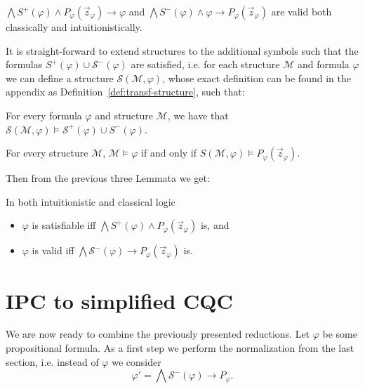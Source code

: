 \documentclass[runningheads]{llncs}
\begin{document}
\begin{lemma}
	$\bigwedge S^+(\varphi)\wedge P_\varphi(\vec z_\varphi)\to\varphi$ and $\bigwedge S^-(\varphi)\wedge \varphi\to P_\varphi(\vec z_\varphi)$ are valid both classically and intuitionistically.
\end{lemma}

It is straight-forward to extend structures to the additional symbols such that the formulas $S^+(\varphi)\cup\mathcal S^-(\varphi)$ are satisfied, i.e. for each structure $\mathcal M$ and formula $\varphi$ we can define a structure $\mathcal S(\mathcal M, \varphi)$, whose exact definition can be found in the appendix as Definition~\ref{def:transf-structure}, such that:
\begin{lemma}\label{thm:struct1}
For every formula $\varphi$ and structure $\mathcal M$, we have that $\mathcal S(\mathcal M, \varphi)\models\mathcal S^+(\varphi)\cup S^-(\varphi)$.
\end{lemma}

\begin{lemma}\label{thm:struct2}
	For every structure $\mathcal M$,
	$\mathcal M\models \varphi$ if and only if $S(\mathcal M, \varphi)\models P_\varphi(\vec z_\varphi)$.
\end{lemma}

Then from the previous three Lemmata we get:

\begin{corollary}\label{equivalid}
	In both intuitionistic and classical logic
	\begin{itemize}
		\item $\varphi$ is satisfiable iff $\mathcal \bigwedge S^+(\varphi)\wedge P_\varphi(\vec z_\varphi)$ is, and
		\item $\varphi$ is valid iff $\bigwedge\mathcal S^-(\varphi)\to P_\varphi(\vec z_\varphi)$ is.
	\end{itemize}
\end{corollary}

\section{IPC to simplified CQC}

We are now ready to combine the previously presented reductions.
Let $\varphi$ be some propositional formula. As a first step we perform the normalization from the last section, i.e. instead of $\varphi$ we consider $$\varphi' = \bigwedge \mathcal S^-(\varphi)\to P_\varphi.$$
\end{document}
